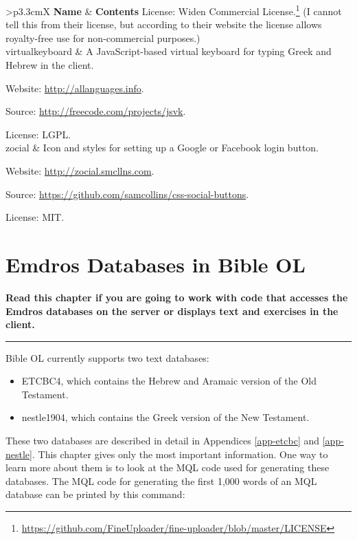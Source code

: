 \documentclass[11pt,oneside,a4paper]{memoir}
\makeatletter
\newenvironment{my-longtabu}[2]{
\begin{longtabu*}{@{}#1@{}}
  \toprule
  #2\\\addlinespace[-1mm]
  \midrule
  \endhead

  \emph{\rmfamily\normalsize(Continued...)} & \\
  \endfoot

  \addlinespace[-1mm]\bottomrule
  \endlastfoot
}{%
\end{longtabu*}
}
\newcommand{\headii}[2]{\textbf{#1} & \textbf{#2}}
\makeatother
\begin{document}
\begin{my-longtabu}{>{\ttfamily}p{3.3cm}X}{ \headii{\textrm{Name}}{Contents} }
License: Widen Commercial
License.\footnote{\url{https://github.com/FineUploader/fine-uploader/blob/master/LICENSE}} (I cannot
tell this from their license, but according to their website the license allows royalty-free use for
non-commercial purposes.)\\

virtualkeyboard & A JavaScript-based virtual keyboard%
for typing Greek and Hebrew in the client.

Website: \url{http://allanguages.info}.

Source: \url{http://freecode.com/projects/jsvk}.

License: LGPL.\\

zocial & Icon and styles for setting up a Google or Facebook
login button.

Website: \url{http://zocial.smcllns.com}.

Source: \url{https://github.com/samcollins/css-social-buttons}.

License: MIT. \\
\end{my-longtabu}



\chapter{Emdros Databases in Bible OL}

\textbf{Read this chapter if you are going to work with code that accesses the Emdros databases on
  the server or displays text and exercises in the client.}
\plainbreak{3}

Bible OL currently supports two text databases:

\begin{itemize}
\item ETCBC4, which contains the Hebrew and Aramaic version of the Old
  Testament.
\item nestle1904, which contains the Greek version of the New Testament.
\end{itemize}

These two databases are described in detail in Appendices \ref{app-etcbc} and
\ref{app-nestle}. This chapter gives only the most important information.
One way to learn more about them is to look at the MQL code used for generating these databases. The
MQL code for generating the first 1,000 words of an MQL database can be printed by this command:
\end{document}
